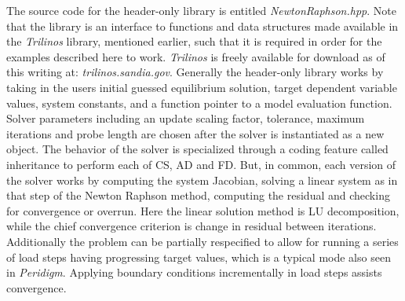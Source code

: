 \documentclass[preprint,12pt]{elsarticle}
\begin{document}
The source code for the header-only library is entitled \emph{NewtonRaphson.hpp}. Note that the library is an interface to functions and data structures made available in the \emph{Trilinos} library, mentioned earlier, such that it is required in order for the examples described here to work. \emph{Trilinos} is freely available for download as of this writing at: \emph{trilinos.sandia.gov}.  Generally the header-only library works by taking in the users initial guessed equilibrium solution, target dependent variable values, system constants, and a function pointer to a model evaluation function. Solver parameters including an update scaling factor, tolerance, maximum iterations and probe length are chosen after the solver is instantiated as a new object. The behavior of the solver is specialized through a coding feature called inheritance to perform each of CS, AD and FD.  But, in common, each version of the solver works by computing the system Jacobian, solving a linear system as in that step of the Newton Raphson method, computing the residual and checking for convergence or overrun. Here the linear solution method is LU decomposition, while the chief convergence criterion is change in residual between iterations.  Additionally the problem can be partially respecified to allow for running a series of load steps having progressing target values, which is a typical mode also seen in \emph{Peridigm}. Applying boundary conditions incrementally in load steps assists convergence.
\end{document}
